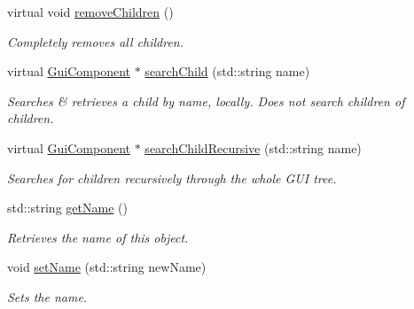 \begin{DoxyCompactItemize}
\mbox{\label{class_gui_component_ac8fea01fa84d85bc1e511211f74cfd53}} 
virtual void \mbox{\hyperlink{class_gui_component_ac8fea01fa84d85bc1e511211f74cfd53}{remove\+Children}} ()
\begin{DoxyCompactList}\small\item\em Completely removes all children. \end{DoxyCompactList}\item 
virtual \mbox{\hyperlink{class_gui_component}{Gui\+Component}} $\ast$ \mbox{\hyperlink{class_gui_component_a2167444f909f08b7be3805309d7ad831}{search\+Child}} (std\+::string name)
\begin{DoxyCompactList}\small\item\em Searches \& retrieves a child by name, locally. Does not search children of children. \end{DoxyCompactList}\item 
virtual \mbox{\hyperlink{class_gui_component}{Gui\+Component}} $\ast$ \mbox{\hyperlink{class_gui_component_a7f1e0e731d458135182850a53de06f95}{search\+Child\+Recursive}} (std\+::string name)
\begin{DoxyCompactList}\small\item\em Searches for children recursively through the whole G\+UI tree. \end{DoxyCompactList}\item 
std\+::string \mbox{\hyperlink{class_gui_component_a521f21d8ae5369fe255a1209fcd3bd0f}{get\+Name}} ()
\begin{DoxyCompactList}\small\item\em Retrieves the name of this object. \end{DoxyCompactList}\item 
void \mbox{\hyperlink{class_gui_component_ae673013e55aa98c6ee267fad3e282766}{set\+Name}} (std\+::string new\+Name)
\begin{DoxyCompactList}\small\item\em Sets the name. \end{DoxyCompactList}\end{DoxyCompactItemize}
